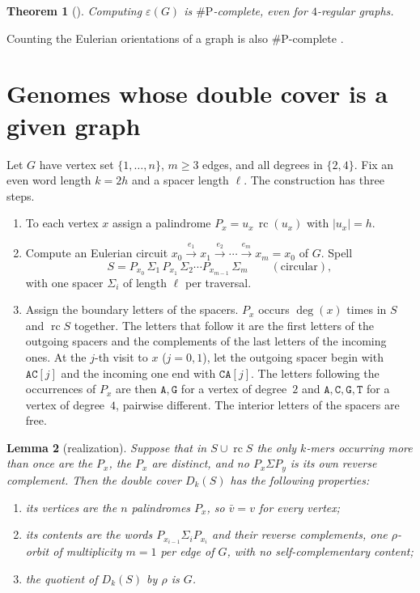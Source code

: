 \documentclass[11pt]{article}
\theoremstyle{plain}
\newtheorem{theorem}{Theorem}
\newtheorem{lemma}[theorem]{Lemma}
\theoremstyle{definition}
\theoremstyle{remark}
\newcommand{\rc}{\operatorname{rc}}
\newcommand{\sP}{\#\mathrm{P}}
\begin{document}
\begin{theorem}[\cite{BW05,GS12}]\label{thm:sharpP}
Computing $\varepsilon(G)$ is $\sP$-complete, even for $4$-regular graphs.
\end{theorem}

Counting the Eulerian orientations of a graph is also $\sP$-complete \cite{MW96}.

\section{Genomes whose double cover is a given graph}\label{sec:real}

Let $G$ have vertex set $\{1,\dots,n\}$, $m\ge3$ edges, and all degrees in $\{2,4\}$. Fix an even word length
$k=2h$ and a spacer length $\ell$. The construction has three steps.
\begin{enumerate}
\item To each vertex $x$ assign a palindrome $P_x=u_x\,\rc(u_x)$ with $|u_x|=h$.
\item Compute an Eulerian circuit $x_0\xrightarrow{e_1}x_1\xrightarrow{e_2}\cdots\xrightarrow{e_m}x_m=x_0$ of $G$.
Spell
\[
S=P_{x_0}\,\Sigma_1\,P_{x_1}\,\Sigma_2\cdots P_{x_{m-1}}\,\Sigma_m\qquad(\text{circular}),
\]
with one spacer $\Sigma_i$ of length $\ell$ per traversal.
\item Assign the boundary letters of the spacers. $P_x$ occurs $\deg(x)$ times in $S$ and $\rc S$
together. The letters that follow it are the first letters of the outgoing spacers and the complements
of the last letters of the incoming ones. At the $j$-th visit to $x$ ($j=0,1$), let the outgoing spacer
begin with $\mathtt{AC}[j]$ and the incoming one end with $\mathtt{CA}[j]$. The letters following the
occurrences of $P_x$ are then $\mathtt A,\mathtt G$ for a vertex of degree~$2$ and
$\mathtt A,\mathtt C,\mathtt G,\mathtt T$ for a vertex of degree~$4$, pairwise different. The interior
letters of the spacers are free.
\end{enumerate}

\begin{lemma}[realization]\label{lem:real}
Suppose that in $S\cup\rc S$ the only $k$-mers occurring more than once are the $P_x$, the $P_x$ are
distinct, and no $P_x\Sigma P_y$ is its own reverse complement. Then the double cover $D_k(S)$ has the
following properties:
\begin{enumerate}
\item its vertices are the $n$ palindromes $P_x$, so $\bar v=v$ for every vertex;
\item its contents are the words $P_{x_{i-1}}\Sigma_iP_{x_i}$ and their reverse complements, one
$\rho$-orbit of multiplicity $m=1$ per edge of $G$, with no self-complementary content;
\item the quotient of $D_k(S)$ by $\rho$ is $G$.
\end{enumerate}
\end{lemma}
\end{document}
